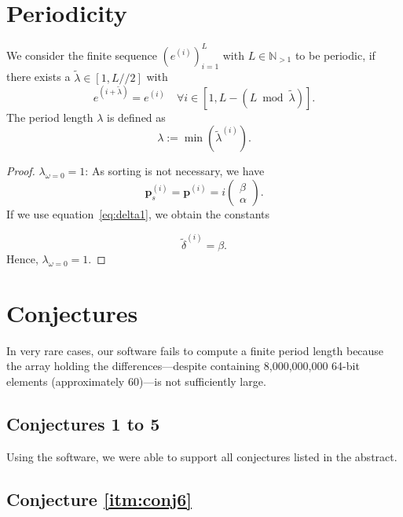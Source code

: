 \documentclass[11pt]{article}
\theoremstyle{remark}
\begin{document}
\section{Periodicity}

We consider the finite sequence $\left(e^{(i)}\right)_{i=1}^{L}$ with $L \in \mathbb{N}_{>1}$ to be periodic, if there exists a $\tilde{\lambda} \in [1, L//2]$ with 
%
\begin{equation}
e^{(i+\tilde{\lambda})} = e^{(i)} \quad \forall i \in [1, L - (L \bmod \tilde{\lambda})].
\end{equation}
%
The period length $\lambda$ is defined as
%
\begin{equation}
\lambda := \min\left(\tilde{\lambda}^{(i)} \right).
\end{equation}
%
\begin{proof}
$\lambda_{\omega = 0} = 1$: As sorting is not necessary, we have
%
\begin{equation}
\mathbf{p}_s^{(i)} = \mathbf{p}^{(i)} = i \begin{pmatrix} \beta \\ \alpha \end{pmatrix}.
\end{equation}
%
If we use equation~\eqref{eq:delta1}, we obtain the constants

\begin{equation}
\tilde{\delta}^{(i)} = \beta.
\end{equation}
%
Hence, $\lambda_{\omega = 0} = 1$.
\end{proof}

\section{Conjectures}

In very rare cases, our \langc software fails to compute a finite period length because the array holding the differences---despite containing 8{,}000{,}000{,}000 64-bit elements (approximately \SI{60}{\gigabyte})---is not sufficiently large.

\subsection{Conjectures 1 to 5}

Using the \langc software, we were able to support all conjectures listed in the abstract.

\subsection{Conjecture \ref{itm:conj6}}
\end{document}

